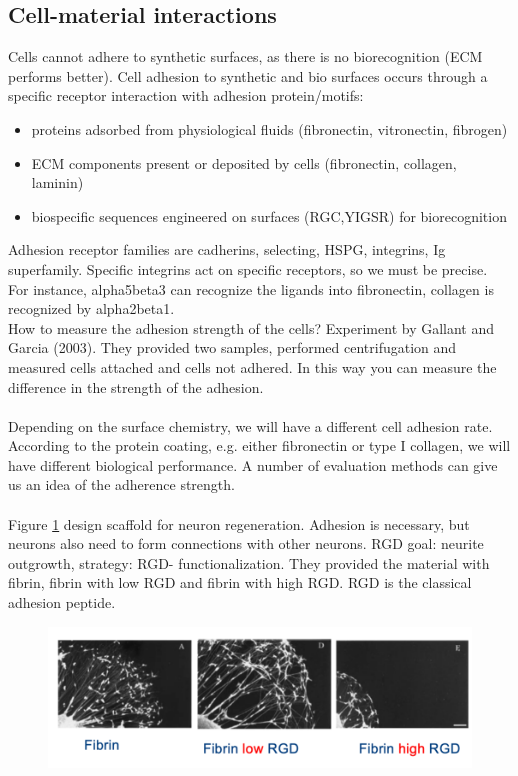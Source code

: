 \subsection{Cell-material interactions}
Cells cannot adhere to synthetic surfaces, as there is no biorecognition (ECM performs better).
Cell adhesion to synthetic and bio surfaces occurs through a specific receptor interaction with adhesion protein/motifs:
\begin{itemize}
\item proteins adsorbed from physiological fluids (fibronectin, vitronectin, fibrogen)
\item ECM components present or deposited by cells (fibronectin, collagen, laminin)
\item biospecific sequences engineered on surfaces (RGC,YIGSR) for biorecognition
\end{itemize}
Adhesion receptor families are cadherins, selecting, HSPG, integrins, Ig superfamily.
Specific integrins act on specific receptors, so we must be precise. For instance, alpha5beta3 can recognize the ligands into fibronectin, collagen is recognized by alpha2beta1.
\\
\noindent
How to measure the adhesion strength of the cells? Experiment by Gallant and Garcia (2003). They provided two samples, performed centrifugation and measured cells attached and cells not adhered. In this way you can measure the difference in the strength of the adhesion.
\\
\\
\noindent
Depending on the surface chemistry, we will have a different cell adhesion rate.  According to the protein coating, e.g. either fibronectin or type I collagen, we will have different biological performance. A number of evaluation methods can give us an idea of the adherence strength.
\\
\\
\noindent
Figure \ref{fig:fibrin} design scaffold for neuron regeneration. Adhesion is necessary, but neurons also need to form connections with other neurons. RGD goal: neurite outgrowth, strategy: RGD- functionalization. They provided the material with fibrin, fibrin with low RGD and fibrin with high RGD. RGD is the classical adhesion peptide.
\begin{figure}[h]
\includegraphics[width=1\textwidth]{fibrin}
\caption{\label{fig:fibrin}}
\end{figure}
